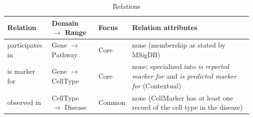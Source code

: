 \begin{table}[htbp]
\centering
\small
\begin{tabularx}{\linewidth}{|l|l|l|X|}
\hline
\textbf{Relation} & \textbf{Domain $\rightarrow$ Range} & \textbf{Focus} & \textbf{Relation attributes} \\ \hline
participates in & Gene $\rightarrow$ Pathway & Core & none (membership as stated by MSigDB) \\ \hline
is marker for & Gene $\rightarrow$ CellType & Core & none; specialized into \emph{is reported marker for} and \emph{is predicted marker for} (Contextual) \\ \hline
observed in & CellType $\rightarrow$ Disease & Common & none (CellMarker has at least one record of the cell type in the disease) \\ \hline
\end{tabularx}
\caption{Relations}
\label{tab:relations}
\end{table}

